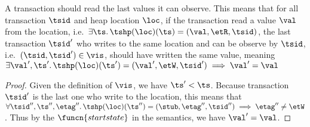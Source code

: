 \begin{lem}[External]
    \label{lem:ext}
    A transaction should read the last values it can observe.
    This means that for all transaction \( \tsid \) and heap location \( \loc \), if the transaction read a value \( \val \) from the location, i.e.\ \( \exists \ts \ldotp \tshp(\loc)(\ts) = (\val, \etR, \tsid) \), the last transaction \( \tsid' \) who writes to the same location and can be observe by \( \tsid \), i.e.\ \( (\tsid, \tsid') \in \vis\), should have written the same value, meaning \( \exists \val', \ts' \ldotp \tshp(\loc)(\ts') = (\val', \etW, \tsid') \implies \val' = \val\)
\end{lem}
\begin{proof}
    Given the definition of \( \vis \), we have \( \ts' < \ts \).
    Because transaction \( \tsid' \) is the last one who write to the location, this means that \( \forall \tsid'', \ts'', \etag'' \ldotp \tshp(\loc)(\ts'') = (\stub, \etag'', \tsid'') \implies \etag'' \neq \etW \).
    Thus by the \( \funcn{startstate} \) in the semantics, we have \( \val' = \val \).
\end{proof}

